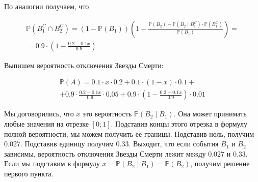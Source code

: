 \documentclass[12pt, a4paper, oneside]{extreport}
\def \mbb{\mathbb}
\def \PP{\mbb{P}}
\theoremstyle{plain}              %
\theoremstyle{definition}         %
\newtheorem{problem}{\color{myblue} Упражнение}
\begin{document}
\begin{sol}
По аналогии получаем, что 

\begin{multline*}
\PP(B_1^C \cap B_2^C) = (1 - \PP(B_1))(1 - \frac{\PP(B_2) - \PP(B_2 \mid B_1^C) \cdot \PP(B_1^C)}{\PP(B_1)} ) = \\ =  0.9 \cdot (1 - \frac{0.2 - 0.1 x}{0.9})
\end{multline*}

Выпишем вероятность отключения Звезды Смерти: 
		
\begin{multline*}
\PP(A) = 0.1 \cdot x \cdot 0.2 + 0.1 \cdot (1-x) \cdot 0.1 + \\ + 0.9 \cdot \frac{0.2 - 0.1x}{0.9} \cdot 0.05 + 0.9 \cdot (1 - \frac{0.2 - 0.1x}{0.9}) \cdot 0.01
\end{multline*}
		
Мы договорились, что  $x$ это вероятность $\PP(B_2 \mid B_1)$. Она может принимать любые значения на отрезке $[0;1]$. Подставив концы этого отрезка в формулу полной вероятности, мы можем получить её границы. Подставив ноль, получим $0.027$. Подставив единицу получим $0.33$. Выходит, что если события $B_1$ и $B_2$ зависимы, вероятность отключения Звезды Смерти лежит между $0.027$ и $0.33$. Если мы подставим в формулу $ x = \PP(B_2 \mid B_1) = \PP(B_2)$, получим решение первого пункта.
\end{sol}


%	
\end{document}

